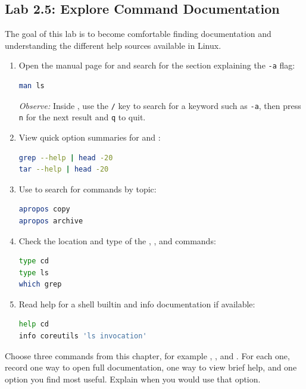 \subsection*{Lab 2.5: Explore Command Documentation}

The goal of this lab is to become comfortable finding documentation and understanding the different help sources available in Linux.

\begin{enumerate}
    \item Open the manual page for  and search for the section explaining the \texttt{-a} flag:
\begin{lstlisting}[language=bash, caption={Opening a manual page}]
man ls
\end{lstlisting}
    \textit{Observe:} Inside , use the \texttt{/} key to search for a keyword such as \texttt{-a}, then press \texttt{n} for the next result and \texttt{q} to quit.

    \item View quick option summaries for  and :
\begin{lstlisting}[language=bash, caption={Quick help summaries}]
grep --help | head -20
tar --help | head -20
\end{lstlisting}

    \item Use  to search for commands by topic:
\begin{lstlisting}[language=bash, caption={Searching for commands by keyword}]
apropos copy
apropos archive
\end{lstlisting}

    \item Check the location and type of the , , and  commands:
\begin{lstlisting}[language=bash, caption={Identifying command types in the shell}]
type cd
type ls
which grep
\end{lstlisting}

    \item Read help for a shell builtin and info documentation if available:
\begin{lstlisting}[language=bash, caption={Builtin help and info}]
help cd
info coreutils 'ls invocation'
\end{lstlisting}
\end{enumerate}

\begin{challengebox}
Choose three commands from this chapter, for example , , and . For each one, record one way to open full documentation, one way to view brief help, and one option you find most useful. Explain when you would use that option.
\end{challengebox}

